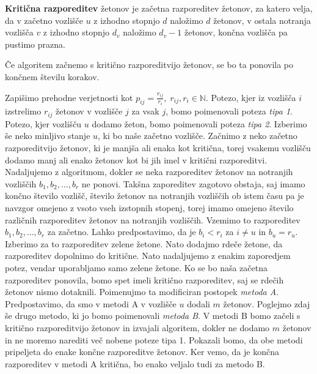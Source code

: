 \documentclass[twoside,11pt]{article}
\begin{document}
\begin{definicija}\label{kritična razporeditev}
    \textbf{Kritična razporeditev} žetonov je začetna razporeditev žetonov, za katero velja, da v začetno vozlišče $u$ z izhodno stopnjo $d$ naložimo $d$ žetonov, v ostala notranja vozlišča $v$ z izhodno stopnjo $d_{v}$ naložimo $d_{v} - 1$ žetonov, končna vozlišča pa pustimo prazna.
\end{definicija}

\begin{trditev}\label{končnost}
    Če algoritem začnemo s kritično razporeditvijo žetonov, se bo ta ponovila po končnem številu korakov.
\end{trditev}

 Zapišimo prehodne verjetnosti kot $p_{ij} = \frac{r_{ij}}{r_{i}},\; r_{ij}, r_{i}\in \mathbb{N}$. Potezo, kjer iz vozlišča $i$ izstrelimo $r_{ij}$ žetonov v vozlišče $j$ za vsak $j$, bomo poimenovali poteza \emph{tipa 1}. Potezo, kjer vozlišču $u$ dodamo žeton, bomo poimenovali poteza \emph{tipa 2}. Izberimo še neko minljivo stanje $u$, ki bo naše začetno vozlišče. Začnimo z neko začetno razporeditvijo žetonov, ki je manjša ali enaka kot kritična, torej vsakemu vozlišču dodamo manj ali enako žetonov kot bi jih imel v kritični razporeditvi. Nadaljujemo z algoritmom, dokler se neka razporeditev žetonov na notranjih vozliščih $b_{1},b_{2},\ldots,b_{r}$ ne ponovi. Takšna zaporeditev zagotovo obstaja, saj imamo končno število vozlišč, število žetonov na notranjih vozliščih ob istem času pa je navzgor omejeno z vsoto vseh izstopnih stopenj, torej imamo omejeno število različnih razporeditev žetonov na notranjih vozliščih. Vzemimo to razporeditev $b_{1},b_{2},\ldots,b_{r}$ za začetno. Lahko predpostavimo, da je $b_{i}<r_{i}$ za $i \neq u$ in $b_{u} = r_{u}$. Izberimo za to razporeditev zelene žetone. Nato dodajmo rdeče žetone, da razporeditev dopolnimo do kritične. Nato nadaljujemo z enakim zaporedjem potez, vendar uporabljamo samo zelene žetone. Ko se bo naša začetna razporeditev ponovila, bomo spet imeli kritično razporeditev, saj se rdečih žetonov nismo dotaknili. Poimenujmo ta modificiran postopek \emph{metoda A}. 
Predpostavimo, da smo v metodi A v vozlišče $u$ dodali $m$ žetonov. Poglejmo zdaj še drugo metodo, ki jo bomo poimenovali \emph{metoda B}. V metodi B bomo začeli s kritično razporeditvijo žetonov in izvajali algoritem, dokler ne dodamo $m$ žetonov in ne moremo narediti več nobene poteze tipa 1. Pokazali bomo, da obe metodi pripeljeta do enake končne razporeditve žetonov. Ker vemo, da je končna razporeditev v metodi A kritična, bo enako veljalo tudi za metodo B. \newline
\end{document}
